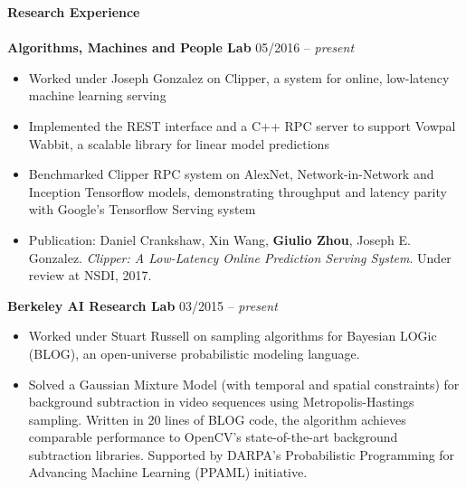 \documentclass{article}
\begin{document}
\noindent
\textbf{{\Large Research Experience}}\\[-2mm]
\HRule\\
\noindent
\textbf{Algorithms, Machines and People Lab}
\hfill 05/2016 -- \textit{present}
\begin{itemize}
\vspace{-1.8mm}
\item Worked under Joseph Gonzalez on Clipper, a system for online, low-latency machine learning serving
\vspace{-2.5mm}
\item Implemented the REST interface and a C++ RPC server to support Vowpal Wabbit, a scalable library for linear model predictions
\vspace{-2.5mm}
\item Benchmarked Clipper RPC system on AlexNet, Network-in-Network and Inception Tensorflow models, demonstrating throughput and latency parity with Google's Tensorflow Serving system
\vspace{-2.5mm}
\item Publication: Daniel Crankshaw, Xin Wang, \textbf{Giulio Zhou}, Joseph E. Gonzalez. \textit{Clipper: A Low-Latency Online Prediction Serving System}. Under review at NSDI, 2017. 
\end{itemize}

\noindent
\textbf{Berkeley AI Research Lab}
\hfill 03/2015 -- \textit{present}
\begin{itemize}
\vspace{-1.8mm}
\item Worked under Stuart Russell on sampling algorithms for Bayesian LOGic (BLOG), an open-universe probabilistic modeling language.
\vspace{-2.5mm}
\item Solved a Gaussian Mixture Model (with temporal and spatial constraints) for background subtraction in video sequences using Metropolis-Hastings sampling. Written in 20 lines of BLOG code, the algorithm achieves comparable performance to OpenCV's state-of-the-art background subtraction libraries. Supported by DARPA's Probabilistic Programming for Advancing Machine Learning (PPAML) initiative.
\end{itemize}
\end{document}
